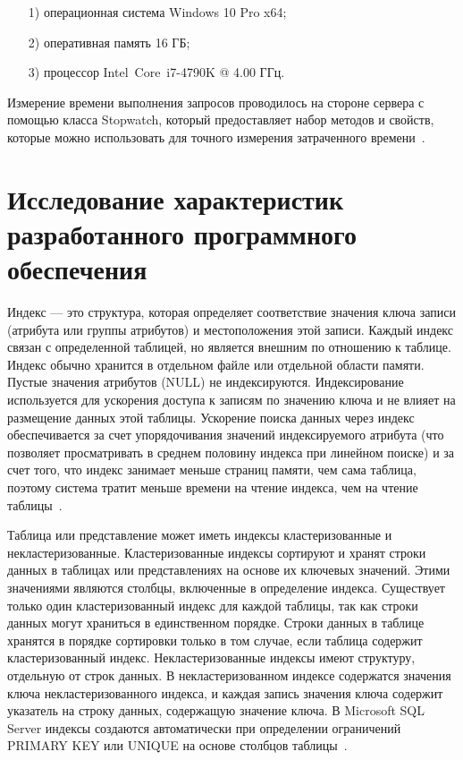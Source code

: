 \documentclass{bmstu}
\begin{document}
\begin{enumerate}
\item[1)]
операционная система Windows 10 Pro x64;
\item[2)]
оперативная память 16 ГБ;
\item[3)]
процессор Intel\textregistered ~Core\texttrademark ~i7-4790K @ 4.00 ГГц.
\end{enumerate}

Измерение времени выполнения запросов проводилось на стороне сервера с помощью класса Stopwatch, который предоставляет набор методов и свойств, которые можно использовать для точного измерения затраченного времени~\cite{Stopwatch}.

\section{Исследование характеристик разработанного программного обеспечения}

Индекс --- это структура, которая определяет соответствие значения ключа записи (атрибута или группы атрибутов) и местоположения этой записи. 
Каждый индекс связан с определенной таблицей, но является внешним по отношению к таблице. 
Индекс обычно хранится в отдельном файле или отдельной области памяти. 
Пустые значения атрибутов (NULL) не индексируются. 
Индексирование используется для ускорения доступа к записям по значению ключа и не влияет на размещение данных этой таблицы. 
Ускорение поиска данных через индекс обеспечивается за счет упорядочивания значений индексируемого атрибута (что позволяет просматривать в среднем половину индекса при линейном поиске) и за счет того, что индекс занимает меньше страниц памяти, чем сама таблица, поэтому система тратит меньше времени на чтение индекса, чем на чтение таблицы~\cite{Karpova2009}.

Таблица или представление может иметь индексы кластеризованные и некластеризованные. 
Кластеризованные индексы сортируют и хранят строки данных в таблицах или представлениях на основе их ключевых значений. 
Этими значениями являются столбцы, включенные в определение индекса. 
Существует только один кластеризованный индекс для каждой таблицы, так как строки данных могут храниться в единственном порядке. 
Строки данных в таблице хранятся в порядке сортировки только в том случае, если таблица содержит кластеризованный индекс. 
Некластеризованные индексы имеют структуру, отдельную от строк данных. 
В некластеризованном индексе содержатся значения ключа некластеризованного индекса, и каждая запись значения ключа содержит указатель на строку данных, содержащую значение ключа. 
В Microsoft SQL Server индексы создаются автоматически при определении ограничений PRIMARY KEY или UNIQUE на основе столбцов таблицы~\cite{Indices}.
\end{document}
